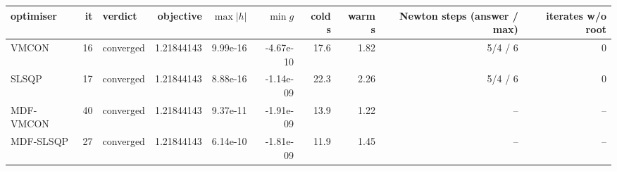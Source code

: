 \begin{tabular}{lrlrrrrrrr}
\toprule
optimiser & it & verdict & objective & $\max|h|$ & $\min g$ & cold s & warm s & Newton steps (answer / max) & iterates w/o root \\
\midrule
VMCON & 16 & converged & 1.21844143 & 9.99e-16 & -4.67e-10 & 17.6 & 1.82 & 5/4 / 6 & 0 \\
SLSQP & 17 & converged & 1.21844143 & 8.88e-16 & -1.14e-09 & 22.3 & 2.26 & 5/4 / 6 & 0 \\
MDF-VMCON & 40 & converged & 1.21844143 & 9.37e-11 & -1.91e-09 & 13.9 & 1.22 & -- & -- \\
MDF-SLSQP & 27 & converged & 1.21844143 & 6.14e-10 & -1.81e-09 & 11.9 & 1.45 & -- & -- \\
\bottomrule
\end{tabular}
